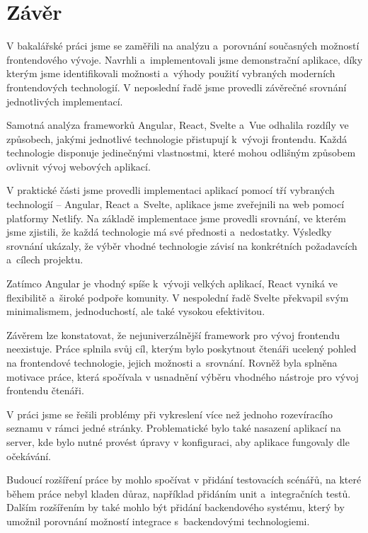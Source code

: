 \section*{Závěr}

V bakalářské práci jsme se zaměřili na analýzu a~porovnání současných možností frontendového vývoje. 
Navrhli a~implementovali jsme demonstrační aplikace, díky kterým jsme identifikovali možnosti a~výhody použití vybraných moderních frontendových technologií. 
V neposlední řadě jsme provedli závěrečné srovnání jednotlivých implementací.

Samotná analýza frameworků Angular, React, Svelte a~Vue odhalila rozdíly ve způsobech, jakými jednotlivé technologie přistupují k~vývoji frontendu. 
Každá technologie disponuje jedinečnými vlastnostmi, které mohou odlišným způsobem ovlivnit vývoj webových aplikací. 

V praktické části jsme provedli implementaci aplikací pomocí tří vybraných technologií -- Angular, React a~Svelte, aplikace jsme zveřejnili na web pomocí platformy Netlify. 
Na základě implementace jsme provedli srovnání, ve kterém jsme zjistili, že každá technologie má své přednosti a~nedostatky. 
Výsledky srovnání ukázaly, že výběr vhodné technologie závisí na konkrétních požadavcích a~cílech projektu.

Zatímco Angular je vhodný spíše k~vývoji velkých aplikací, React vyniká ve flexibilitě a~široké podpoře komunity. 
V nespolední řadě Svelte překvapil svým minimalismem, jednoduchostí, ale také vysokou efektivitou.

Závěrem lze konstatovat, že nejuniverzálnější framework pro vývoj frontendu neexistuje. 
Práce splnila svůj cíl, kterým bylo poskytnout čtenáři ucelený pohled na frontendové technologie, jejich možnosti a~srovnání.
Rovněž byla splněna motivace práce, která spočívala v usnadnění výběru vhodného nástroje pro vývoj frontendu čtenáři.

V práci jsme se řešili problémy při vykreslení více než jednoho rozevíracího seznamu v rámci jedné stránky. 
Problematické bylo také nasazení aplikací na server, kde bylo nutné provést úpravy v konfiguraci, aby aplikace fungovaly dle očekávání.

Budoucí rozšíření práce by mohlo spočívat v přidání testovacích scénářů, na které během práce nebyl kladen důraz, například přidáním unit a~integračních testů.
Dalším rozšířením by také mohlo být přidání backendového systému, který by umožnil porovnání možností integrace s~backendovými technologiemi.


